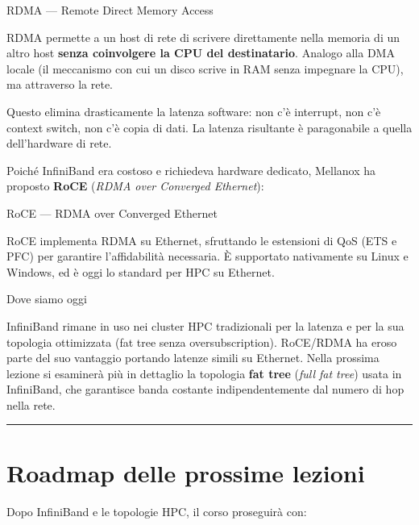 \documentclass[
  italian,
  openany]{book}
\begin{document}
\begin{calloutdefinition}{RDMA — Remote Direct Memory Access}

RDMA permette a un host di rete di scrivere direttamente nella memoria
di un altro host \textbf{senza coinvolgere la CPU del destinatario}.
Analogo alla DMA locale (il meccanismo con cui un disco scrive in RAM
senza impegnare la CPU), ma attraverso la rete.

\end{calloutdefinition}

Questo elimina drasticamente la latenza software: non c'è interrupt, non
c'è context switch, non c'è copia di dati. La latenza risultante è
paragonabile a quella dell'hardware di rete.

Poiché InfiniBand era costoso e richiedeva hardware dedicato, Mellanox
ha proposto \textbf{RoCE} (\emph{RDMA over Converged Ethernet}):

\begin{calloutdefinition}{RoCE — RDMA over Converged Ethernet}

RoCE implementa RDMA su Ethernet, sfruttando le estensioni di QoS (ETS e
PFC) per garantire l'affidabilità necessaria. È supportato nativamente
su Linux e Windows, ed è oggi lo standard per HPC su Ethernet.

\end{calloutdefinition}

\begin{calloutnote}{Dove siamo oggi}

InfiniBand rimane in uso nei cluster HPC tradizionali per la latenza e
per la sua topologia ottimizzata (fat tree senza oversubscription).
RoCE/RDMA ha eroso parte del suo vantaggio portando latenze simili su
Ethernet. Nella prossima lezione si esaminerà più in dettaglio la
topologia \textbf{fat tree} (\emph{full fat tree}) usata in InfiniBand,
che garantisce banda costante indipendentemente dal numero di hop nella
rete.

\end{calloutnote}

\begin{center}\rule{0.5\linewidth}{0.5pt}\end{center}

\section{Roadmap delle prossime
lezioni}\label{roadmap-delle-prossime-lezioni}

Dopo InfiniBand e le topologie HPC, il corso proseguirà con:
\end{document}
